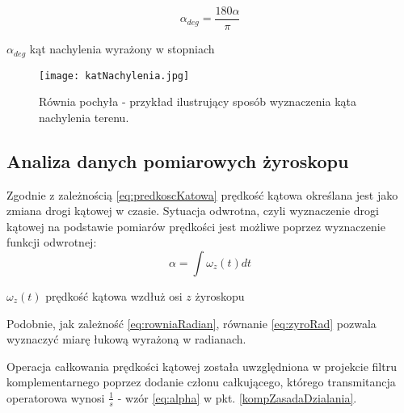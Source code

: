 \begin{equation}
    \alpha_{deg}=\frac{180\alpha}{\pi}
    \label{eq:rowniaStopnie}
\end{equation}
\begin{eqwhere}[2cm]
	\item[$\alpha_{deg}$] kąt nachylenia wyrażony w stopniach
\end{eqwhere}
\begin{figure}[h]
    \centering
    \texttt{[image: katNachylenia.jpg]}
    \caption{Równia pochyła - przykład ilustrujący sposób wyznaczenia kąta nachylenia terenu.}
    \label{fig:rownia}
\end{figure}
\subsection{Analiza danych pomiarowych żyroskopu}
\label{gyro}
Zgodnie z zależnością \ref{eq:predkoscKatowa} prędkość kątowa określana jest jako zmiana drogi kątowej w czasie. Sytuacja odwrotna, czyli wyznaczenie drogi kątowej na podstawie pomiarów prędkości jest możliwe poprzez wyznaczenie funkcji odwrotnej:
\begin{equation}  
    \alpha = \int{\omega_{z}(t)dt}
    \label{eq:zyroRad}
\end{equation}
\begin{eqwhere}[2cm]
	\item[$\omega_{z}(t)$] prędkość kątowa wzdłuż osi $z$ żyroskopu
	
\end{eqwhere}

Podobnie, jak zależność \ref{eq:rowniaRadian}, równanie \ref{eq:zyroRad} pozwala wyznaczyć miarę łukową wyrażoną w radianach.

Operacja całkowania prędkości kątowej została uwzględniona w projekcie filtru komplementarnego poprzez dodanie członu całkującego, którego transmitancja operatorowa wynosi $\frac{1}{s}$ - wzór \ref{eq:alpha} w pkt. \ref{kompZasadaDzialania}.

